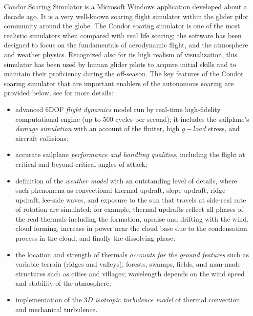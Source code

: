 \documentclass[letterpaper, 10 pt, conference]{ieeeconf}  %
\newcommand{\squeezeup}{\vspace{-1.0mm}}
\begin{document}
Condor Soaring Simulator is a Microsoft Windows application developed about a decade ago. It is a very well-known soaring flight simulator within the glider pilot community around the globe. The Condor soaring simulator is one of the most realistic simulators when compared with real life soaring; the software has been designed to focus on the fundamentals of aerodynamic flight, and the atmosphere and weather physics. Recognized also for its high realism of visualization, this simulator has been used by human glider pilots to acquire initial skills and to maintain their proficiency during the off-season.
The key features of the Condor soaring simulator that are important enablers of the autonomous soaring are provided below, see \cite{Condor:2013:Online} for more details:
\squeezeup
\begin{itemize}
  \item advanced 6DOF \emph{flight dynamics} model run by real-time high-fidelity computational engine (up to 500 cycles per second); it includes the sailplane's \emph{damage simulation} with an account of the flutter, high $g-load$ stress, and aircraft collisions;
  \item accurate sailplane \emph{performance and handling qualities}, including the flight at critical and beyond critical angles of attack;
  \item definition of the \emph{weather model} with an outstanding level of details, where such phenomena as convectional thermal updraft, slope updraft, ridge updraft, lee-side waves, and exposure to the sun that travels at side-real rate of rotation are simulated; for example, thermal updrafts reflect all phases of the real thermals including the formation, upraise and drifting with the wind, cloud forming, increase in power near the cloud base due to the condensation process in the cloud, and finally the dissolving phase;
  \item the location and strength of thermals \emph{accounts for the ground features} such as variable terrain (ridges and valleys), forests, swamps, fields, and man-made structures such as cities and villages; wavelength depends on the wind speed and stability of the atmosphere;
  \item implementation of the $3D$ \emph{isotropic turbulence model} of thermal convection and mechanical turbulence.
\end{itemize}
\end{document}
